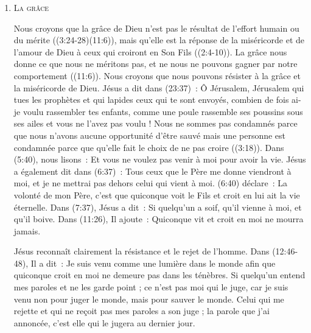 \begin{enumerate}
  \item  \textsc{La grâce}

\nobreak
\begin{specialpar}{}
Nous croyons que la grâce de Dieu n'est pas le résultat de l'effort \pocketlinebreak
 humain ou du mérite
 (\BRallowhypbch{}(3:24-28)\BRchsep{}(11:6)\BRforbidhypbch),
 mais qu'elle est la réponse
 de la miséricorde et de l'amour de Dieu à ceux qui croiront en Son Fils
 ((2:4-10)).
 La grâce nous donne 
 ce que nous ne méritons pas, et ne nous ne pouvons gagner par notre comportement
 ((11:6)).
 Nous croyons que nous pouvons résister à la grâce et la miséricorde de Dieu.
 Jésus a dit dans (23:37)~:
 \og Ô Jérusalem, Jérusalem qui tues les prophètes
 et qui lapides ceux qui te sont envoyés, combien de fois ai-je voulu rassembler tes enfants,
 comme une poule rassemble ses poussins sous ses ailes et vous ne l'avez pas voulu ! \fg{}
 Nous ne sommes pas condamnés parce que nous n'avons aucune opportunité d'être sauvé
 mais une personne est condamnée parce que qu'elle fait le choix de ne pas croire
 ((3:18)).
 Dans (5:40), nous lisons~:
 \og Et vous ne voulez pas venir à moi pour avoir la vie. \fg{}
 Jésus a également dit dans (6:37)~:
 \og Tous ceux que le Père me donne viendront à moi,
 et je ne mettrai pas dehors celui qui vient à moi. \fg{}
 (6:40) déclare~:
 \og La volonté de mon Père, c'est que quiconque voit le Fils
 et croit en lui ait la vie éternelle. \fg{}
 Dans (7:37), Jésus a dit~:
 \og Si quelqu'un a soif, qu'il vienne à moi, et qu'il boive. \fg{}
 Dans (11:26), Il ajoute~:
 \og Quiconque vit et croit en moi ne mourra jamais. \fg{}
\end{specialpar}

Jésus reconnaît clairement la résistance et le rejet de l'hom\-me.
 Dans (12:46-48), Il a dit~:
 \og Je suis venu comme une lumière dans le monde afin que quiconque croit en  moi
 ne demeure pas dans les ténèbres. Si quelqu'un entend mes paroles et ne les garde point ;
 ce n'est pas moi qui le juge, car je suis venu non pour juger le monde, mais pour sauver le monde.
 Celui qui me rejette et qui ne reçoit pas mes paroles a son juge ;
 la parole que j'ai annoncée, c'est elle qui le jugera au dernier jour. \fg{}


\end{enumerate}
